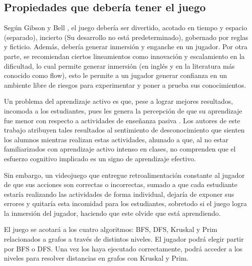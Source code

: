 \documentclass[submission]{eptcs}
\begin{document}
\subsection{Propiedades que debería tener el juego}

Según Gibson y Bell \cite{evaluation_of_games_for_teaching_cs}, el juego debería ser divertido, acotado en tiempo y espacio (separado), incierto
(Su desarrollo no está predeterminado), gobernado por reglas y ficticio. Además, debería generar inmersión y enganche en un jugador.
Por otra parte, se recomiendan ciertos lineamientos como innovación y escalamiento en la dificultad, lo cual permite generar
inmersión (en inglés y en la literatura más conocido como flow), esto le permite a un jugador generar confianza en
un ambiente libre de riesgos para experimentar y poner a prueba sus conocimientos. 

Un problema del aprendizaje activo es que, pese a lograr mejores resultados, incomoda a los estudiantes, pues les
genera la percepción de que su aprendizaje fue menor con respecto a actividades de enseñanza pasiva \cite{active_learning_versus_feeling_of_learning}.
Los autores de este trabajo atribuyen tales resultados al sentimiento de desconocimiento que sienten los alumnos mientras realizan estas actividades,
ahunado a que, al no estar familiarizados con aprendizaje activo intenso en clases, no comprenden que
el esfuerzo cognitivo implicado es un signo de aprendizaje efectivo.

Sin embargo, un videojuego que entregue retroalimentación constante al jugador de que sus acciones
son correctas o incorrectas, sumado a que cada estudiante estaría realizando las actividades
de forma individual, dejaría de exponer sus errores y quitaría esta incomidad para los estudiantes,
sobretodo si el juego logra la inmersión del jugador, haciendo que este olvide que está aprendiendo.

El juego se acotará a los cuatro algoritmos: BFS, DFS, Kruskal y Prim relacionados a grafos a través de distintos niveles.
El jugador podrá elegir partir por BFS o DFS. Una vez los haya ejecutado correctamente, podrá acceder a los niveles para resolver
distancias en grafos con Kruskal y Prim.


\end{document}
